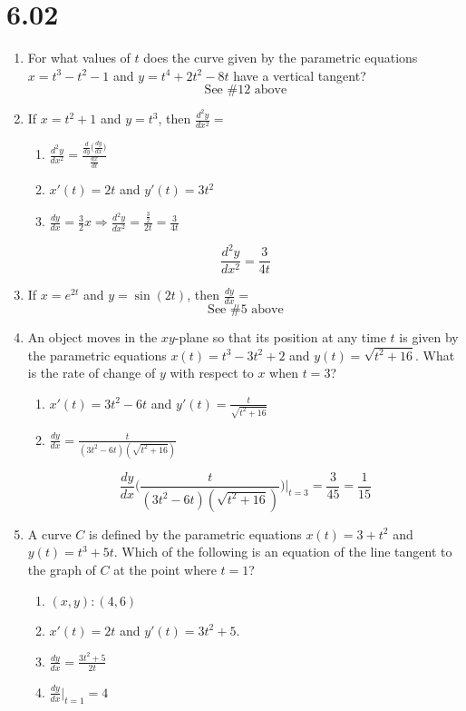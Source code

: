 \documentclass[12pt]{article}
\begin{document}
\section*{6.02}
\begin{enumerate}
    \item For what values of $t$ does the curve given by the parametric equations $x=t^3-t^2-1$ and $y=t^4+2t^2-8t$ have a vertical tangent? 
   $$ \boxed{\text{See \# 12 above}}$$
    \item If $x=t^2+1$ and $y=t^3$, then $\frac{d^2y}{dx^2} =$
    \begin{enumerate}
        \item $\frac{d^2y}{dx^2} =\frac{\frac{d}{dy}\big(\frac{dy}{dx}\big)}{\frac{dx}{dt}} $
        \item $x'(t) = 2t$ and $y'(t) = 3t^2$
        \item $\frac{dy}{dx} = \frac{3}{2}x \Longrightarrow \frac{d^2y}{dx^2} = \frac{\frac{3}{2}}{2t} = \frac{3}{4t}$
    \end{enumerate}
    $$\boxed{\frac{d^2y}{dx^2} = \frac{3}{4t}}$$
    \item If $x=e^{2t}$ and $y=\sin(2t)$, then $\frac{dy}{dx}=$
    $$ \boxed{\text{See \# 5 above}}$$
    \item An object moves in the $xy$-plane so that its position at any time $t$ is given by the parametric equations $x(t) =t^3-3t^2 +2$ and $y(t)=\sqrt{t^2+16}$. What is the rate of change of $y$ with respect to $x$ when $t = 3$?
    \begin{enumerate}
        \item $x'(t) = 3t^2-6t$ and $y'(t) = \frac{t}{\sqrt{t^2+16}}$
        \item $\frac{dy}{dx} = \frac{t}{(3t^2-6t)(\sqrt{t^2+16})}$
    \end{enumerate}
    $$\frac{dy}{dx}\bigg(\frac{t}{(3t^2-6t)(\sqrt{t^2+16})}\bigg) \bigg\rvert_{t = 3} = \frac{3}{45} = \boxed{\frac{1}{15}}$$
    \item A curve $C$ is defined by the parametric equations $x(t) = 3 + t^2$ and $y(t) = t^3 + 5t$. Which of the following is an equation of the line tangent to the graph of $C$ at the point where $t = 1$?
    \begin{enumerate}
        \item $(x,y): (4,6)$
        \item $x'(t) = 2t$ and $y'(t)=3t^2+5$.
        \item $\frac{dy}{dx} = \frac{3t^2+5}{2t}$
        \item $\frac{dy}{dx}\big\rvert_{t=1} = 4$

\end{enumerate}
\end{enumerate}
\end{document}

